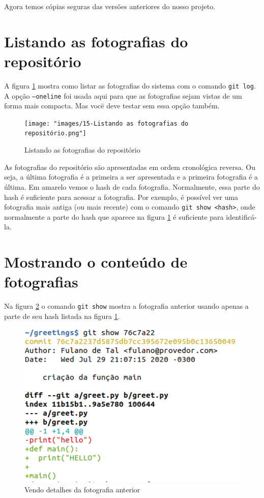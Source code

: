 \documentclass[a4paper]{book}
\begin{document}
Agora temos cópias seguras das versões anteriores
do nosso projeto. 

\newpage
\section{Listando as fotografias do repositório}

A figura \ref{fig:15} mostra como listar as fotografias do 
sistema com o comando \texttt{git log}.
A opção \texttt{--oneline} foi usada aqui para que 
as fotografias sejam vistas de um forma mais compacta.
Mas vocë deve testar sem essa opção também.
%
\begin{figure}[ht]
\caption{Listando as fotografias do repositório}
\label{fig:15}
\centering
\texttt{[image: "images/15-Listando as fotografias do repositório.png"]}
\end{figure}

As fotografias do repositório são apresentadas em ordem cronológica
reversa. Ou seja, a última fotografia é a primeira a ser apresentada
e a primeira fotografia é a última.
Em amarelo vemos o hash de cada fotografia.
Normalmente, essa parte do hash é suficiente para acessar a
fotografia.
Por exemplo, é possível ver uma fotografia mais antiga 
(ou mais recente) com o comando \texttt{git show <hash>},
onde normalmente a parte do hash que aparece na figura
\ref{fig:15} é suficiente para identificá-la.

\newpage
\section{Mostrando o conteúdo de fotografias}

Na figura \ref{fig:16} o comando \texttt{git show}
mostra a fotografia anterior usando apenas a parte de seu hash
listada na figura \ref{fig:15}.

\begin{figure}[ht]
\caption{Vendo detalhes da fotografia anterior}
\label{fig:16}
\centering
\includegraphics[scale=0.6,left]{"images/16-Vendo detalhes da fotografia anterior.png"}
\end{figure}
\end{document}
